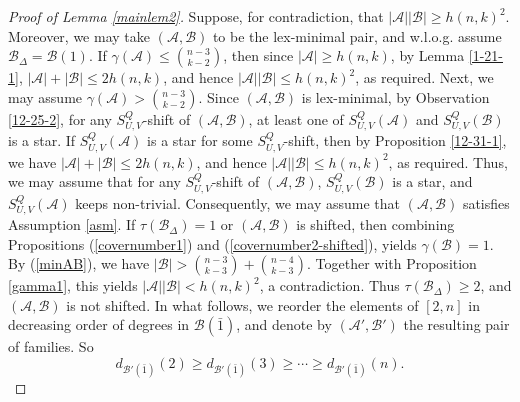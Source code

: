 \documentclass[a4paper,11pt]{article}
\newcommand{\m}{\mathcal}
\begin{document}
\begin{proof}[Proof of Lemma \ref{mainlem2}]
Suppose, for contradiction, that $|\mathcal A||\mathcal B|\ge h(n,k)^2.$ 
Moreover, we may take $(\m A, \m B)$ to be the lex-minimal pair, and w.l.o.g. assume $\mathcal B_\Delta=\mathcal B(1).$
If $\gamma(\m A)\le {n-3\choose k-2}$, then since $|\m A|\ge h(n,k)$, by Lemma \ref{1-21-1}, $|\m A|+|\m B|\le 2h(n,k)$, and hence $|\mathcal A||\mathcal B|\le h(n,k)^2$, as required. 
Next, we may assume $\gamma(\m A)> {n-3\choose k-2}$. 
Since $(\m A, \m B)$ is lex-minimal, by Observation \ref{12-25-2}, for any $S_{U,V}^Q$-shift of $(\m A, \m B)$, at least one of $S_{U,V}^Q(\m A)$ and $S_{U,V}^Q(\m B)$ is a star. If $S_{U,V}^Q(\m A)$ is a star for some $S_{U,V}^Q$-shift, then by Proposition \ref{12-31-1}, we have $|\m A|+|\m B|\le 2h(n,k)$, and hence $|\mathcal A||\mathcal B|\le h(n,k)^2$, as required. Thus, we may assume that for any $S_{U,V}^Q$-shift of $(\m A, \m B)$, $S_{U,V}^Q(\m B)$ is a star, and $S_{U,V}^Q(\m A)$ keeps non-trivial. 
Consequently, we may assume that
$(\mathcal A,\mathcal B)$ satisfies Assumption \ref{asm}. 
If $\tau(\m B_{\Delta})=1$ or $(\m A, \m B)$ is shifted, then combining Propositions (\ref{covernumber1}) and (\ref{covernumber2-shifted}), yields $\gamma(\m B)=1$. 
By (\ref{minAB}), we have $|\m B|>{n-3\choose k-3}+{n-4\choose k-3}$. Together with Proposition \ref{gamma1}, this yields $|\m A||\m B|<h(n,k)^2$, a contradiction. Thus $\tau(\m B_{\Delta})\ge 2$, and $(\mathcal A,\mathcal B)$ is not shifted. 
In what follows, we reorder the elements of $[2,n]$ in decreasing order of degrees in $\m B(\bar 1)$, and denote by $(\m A', \m B')$ the resulting pair of families. So 
\begin{equation}\label{6-9-1}
d_{\mathcal B'(\bar1)}(2)\ge d_{\mathcal B'(\bar1)}(3)
\ge \cdots \ge d_{\mathcal B'(\bar1)}(n).
\end{equation}


\end{proof}
\end{document}

